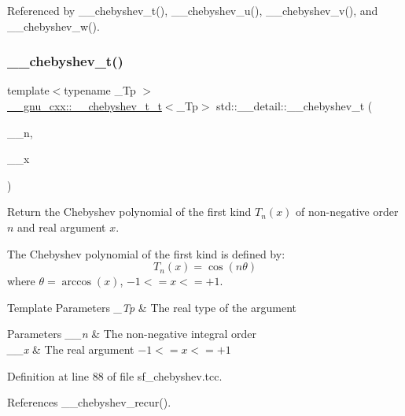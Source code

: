 Referenced by \+\_\+\+\_\+chebyshev\+\_\+t(), \+\_\+\+\_\+chebyshev\+\_\+u(), \+\_\+\+\_\+chebyshev\+\_\+v(), and \+\_\+\+\_\+chebyshev\+\_\+w().

\mbox{\label{namespacestd_1_1____detail_ac23b4d357a95f4ba24503350999fd52d}} 
\subsubsection{\texorpdfstring{\+\_\+\+\_\+chebyshev\+\_\+t()}{\_\_chebyshev\_t()}}
{\footnotesize\ttfamily template$<$typename \+\_\+\+Tp $>$ \\
\hyperlink{struct____gnu__cxx_1_1____chebyshev__t__t}{\+\_\+\+\_\+gnu\+\_\+cxx\+::\+\_\+\+\_\+chebyshev\+\_\+t\+\_\+t}$<$\+\_\+\+Tp$>$ std\+::\+\_\+\+\_\+detail\+::\+\_\+\+\_\+chebyshev\+\_\+t (\begin{DoxyParamCaption}\item[{unsigned int}]{\+\_\+\+\_\+n,  }\item[{\+\_\+\+Tp}]{\+\_\+\+\_\+x }\end{DoxyParamCaption})}

Return the Chebyshev polynomial of the first kind $ T_n(x) $ of non-\/negative order $ n $ and real argument $ x $.

The Chebyshev polynomial of the first kind is defined by\+: \[ T_n(x) = \cos(n \theta) \] where $ \theta = \arccos(x) $, $ -1 <= x <= +1 $.


\begin{DoxyTemplParams}{Template Parameters}
{\em \+\_\+\+Tp} & The real type of the argument \\
\hline
\end{DoxyTemplParams}

\begin{DoxyParams}{Parameters}
{\em \+\_\+\+\_\+n} & The non-\/negative integral order \\
\hline
{\em \+\_\+\+\_\+x} & The real argument $ -1 <= x <= +1 $ \\
\hline
\end{DoxyParams}


Definition at line 88 of file sf\+\_\+chebyshev.\+tcc.



References \+\_\+\+\_\+chebyshev\+\_\+recur().

